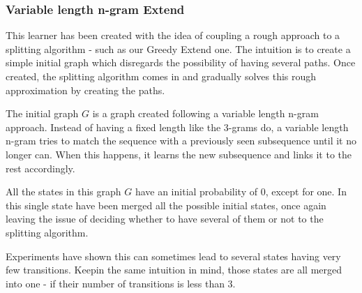 \subsubsection{Variable length n-gram Extend}
This learner has been created with the idea of coupling a rough approach to a splitting algorithm - such as our Greedy Extend one. The intuition is to create a simple initial graph which disregards the possibility of having several paths. Once created, the splitting algorithm comes in and gradually solves this rough approximation by creating the paths.

The initial graph $G$ is a graph created following a variable length n-gram approach. Instead of having a fixed length like the 3-grams do, a variable length n-gram tries to match the sequence with a previously seen subsequence until it no longer can. When this happens, it learns the new subsequence and links it to the rest accordingly.

All the states in this graph $G$ have an initial probability of 0, except for one. In this single state have been merged all the possible initial states, once again leaving the issue of deciding whether to have several of them or not to the splitting algorithm.

Experiments have shown this can sometimes lead to several states having very few transitions. Keepin the same intuition in mind, those states are all merged into one - if their number of transitions is less than 3.